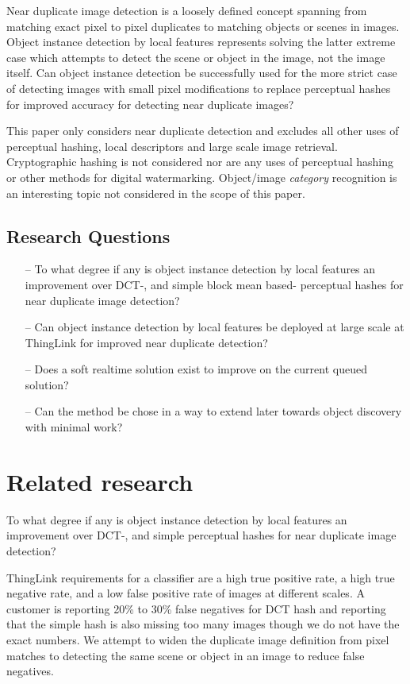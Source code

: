 \documentclass[english,12pt,a4paper,pdftex,elec,utf8]{aaltothesis}
\begin{document}
Near duplicate image detection is a loosely defined concept spanning from matching exact pixel to pixel duplicates to matching objects or scenes in images. Object instance detection by local features represents solving the latter extreme case which attempts to detect the scene or object in the image, not the image itself. Can object instance detection be successfully used for the more strict case of detecting images with small pixel modifications to replace perceptual hashes for improved accuracy for detecting near duplicate images?

This paper only considers near duplicate detection and excludes all other uses of perceptual hashing, local descriptors and large scale image retrieval. Cryptographic hashing is not considered nor are any uses of perceptual hashing or other methods for digital watermarking. Object/image \emph{category} recognition is an interesting topic not considered in the scope of this paper.

\subsection{Research Questions}
\begin{itemize}
\item[--] To what degree if any is object instance detection by local features an improvement over DCT-, and simple block mean based- perceptual hashes for near duplicate image detection?
\item[--] Can object instance detection by local features be deployed at large scale at ThingLink for improved near duplicate detection?
\item[--] Does a soft realtime solution exist to improve on the current queued solution?
  \item[--] Can the method be chose in a way to extend later towards object discovery with minimal work?
\end{itemize}

\clearpage

\section{Related research}
To what degree if any is object instance detection by local features an improvement over DCT-, and simple perceptual hashes for near duplicate image detection?

ThingLink requirements for a classifier are a high true positive rate, a high true negative rate, and a low false positive rate of images at different scales. A customer is reporting 20\% to 30\% false negatives for DCT hash and reporting that the simple hash is also missing too many images though we do not have the exact numbers. We attempt to widen the duplicate image definition from pixel matches to detecting the same scene or object in an image to reduce false negatives.
\end{document}
